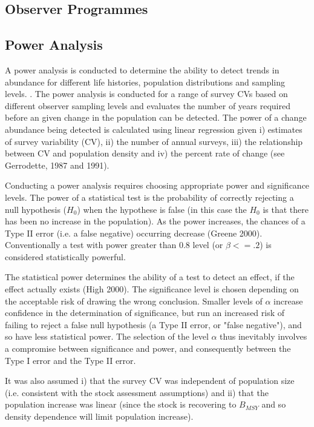 \documentclass[preprint,authoryear,12pt]{elsarticle}
\begin{document}
\subsection{Observer Programmes}

\subsection{Power Analysis}
A power analysis is conducted to determine the ability to detect trends in abundance for different life histories, population distributions
and sampling levels.
.
The power analysis is conducted for a range of survey CVs based on different observer sampling levels and evaluates the number of years 
required before an given change in the population can be detected. The power of a change abundance being detected is 
calculated using linear regression given i) estimates of survey variability (CV), ii) the number of annual surveys, iii) 
the relationship between CV and population density and iv) the percent rate of change (see Gerrodette, 1987 and 1991).
 
Conducting a power analysis requires choosing appropriate power and significance levels. The power of a statistical test is 
the probability of correctly rejecting a null hypothesis ($H_0$) when the hypothese is false (in this case the $H_0$ is that 
there has been no increase in the population).  As the power increases, the chances of a Type II error (i.e. a false negative) 
occurring decrease (Greene 2000). Conventionally a test with power greater than 0.8 level (or $\beta<=.2$) is considered statistically 
powerful.

The statistical power determines the ability of a test to detect an effect, if the effect actually exists (High 2000). The significance level is chosen depending on the acceptable risk of drawing the wrong conclusion. Smaller levels of $\alpha$ increase confidence in the determination of significance, but run an increased risk of failing to reject a false null hypothesis (a Type II error, or "false negative"), and so have less statistical power. The selection of the level $\alpha$ thus inevitably involves a compromise between significance and power, and consequently between the Type I error and the Type II error.

It was also assumed i) that the survey CV was independent of population size (i.e. consistent with the stock assessment assumptions) and ii) that the population increase was linear (since the stock is recovering to $B_{MSY}$ and so density dependence will limit population increase). 
\end{document}
